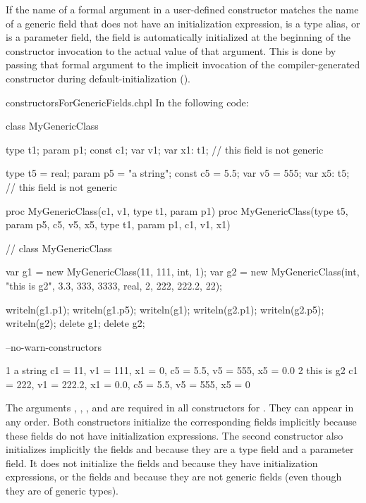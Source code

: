 If the name of a formal argument in a user-defined constructor matches the name
of a generic field that does not have an initialization
expression, is a type alias, or is a parameter field, the field is
automatically initialized at the beginning of the constructor invocation
to the actual value of that argument.
This is done by passing that formal argument to the implicit invocation
of the compiler-generated constructor during default-initialization ().


\begin{chapelexample}{constructorsForGenericFields.chpl}
In the following code:
\begin{chapel}
class MyGenericClass {
  type t1;
  param p1;
  const c1;
  var v1;
  var x1: t1; // this field is not generic

  type t5 = real;
  param p5 = "a string";
  const c5 = 5.5;
  var v5 = 555;
  var x5: t5; // this field is not generic

  proc MyGenericClass(c1, v1, type t1, param p1) { }
  proc MyGenericClass(type t5, param p5, c5, v5, x5,
                     type t1, param p1, c1, v1, x1) { }
}  // class MyGenericClass

var g1 = new MyGenericClass(11, 111, int, 1);
var g2 = new MyGenericClass(int, "this is g2", 3.3, 333, 3333,
                            real, 2, 222, 222.2, 22);
\end{chapel}
\begin{chapelpost}
writeln(g1.p1);
writeln(g1.p5);
writeln(g1);
writeln(g2.p1);
writeln(g2.p5);
writeln(g2);
delete g1;
delete g2;
\end{chapelpost}
\begin{chapelcompopts}
--no-warn-constructors
\end{chapelcompopts}
\begin{chapeloutput}
1
a string
{c1 = 11, v1 = 111, x1 = 0, c5 = 5.5, v5 = 555, x5 = 0.0}
2
this is g2
{c1 = 222, v1 = 222.2, x1 = 0.0, c5 = 5.5, v5 = 555, x5 = 0}
\end{chapeloutput}
The arguments , , , and  are
required in all constructors for . They can appear
in any order. Both  constructors initialize the
corresponding fields implicitly because these fields do not have initialization
expressions. The second constructor also initializes implicitly
the fields  and  because they are a type field
and a parameter field. It does not initialize the fields 
and  because they have initialization expressions, or
the fields  and  because they are not generic fields
(even though they are of generic types).
\end{chapelexample}

